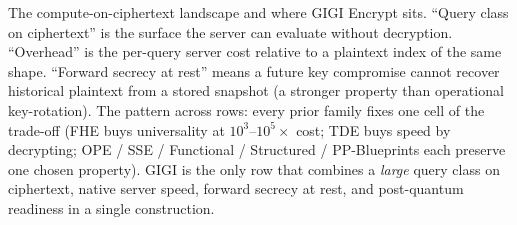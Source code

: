 \documentclass[11pt,letterpaper]{article}
\begin{document}
\begin{table}[p]
\centering
\vspace*{\fill}
\caption{The compute-on-ciphertext landscape and where GIGI
Encrypt sits. ``Query class on ciphertext'' is the surface the
server can evaluate without decryption. ``Overhead'' is the
per-query server cost relative to a plaintext index of the same
shape. ``Forward secrecy at rest'' means a future key compromise
cannot recover historical plaintext from a stored snapshot
(a stronger property than operational key-rotation). The pattern
across rows: every prior family fixes one cell of the trade-off
(FHE buys universality at $10^3$--$10^5\times$ cost; TDE buys
speed by decrypting; OPE / SSE / Functional / Structured /
PP-Blueprints each preserve one chosen property). GIGI is the
only row that combines a \emph{large} query class on ciphertext,
native server speed, forward secrecy at rest, and post-quantum
readiness in a single construction.}
\label{tab:landscape}
\vspace{1.5em}


\end{table}
\end{document}
